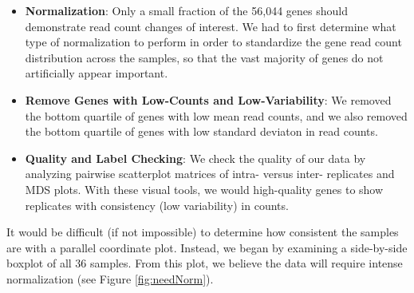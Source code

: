 \documentclass[11pt,a4paper,oldfontcommands,openany]{memoir}
\numberwithin{equation}{section} %
\begin{document}
\begin{itemize}

\item \textbf{Normalization}: Only a small fraction of the 56,044 genes should demonstrate read count changes of interest. We had to first determine what type of normalization to perform in order to standardize the gene read count distribution across the samples, so that the vast majority of genes do not artificially appear important.

\item \textbf{Remove Genes with Low-Counts and Low-Variability}: We removed the bottom quartile of genes with low mean read counts, and we also removed the bottom quartile of genes with low standard deviaton in read counts.

\item \textbf{Quality and Label Checking}: We check the quality of our data by analyzing pairwise scatterplot matrices of intra- versus inter- replicates and MDS plots. With these visual tools, we would high-quality genes to show replicates with consistency (low variability) in counts.

\end{itemize}

It would be difficult (if not impossible) to determine how consistent the samples are with a parallel coordinate plot. Instead, we began by examining a side-by-side boxplot of all 36 samples. From this plot, we believe the data will require intense normalization (see Figure \ref{fig:needNorm}).
\end{document}
